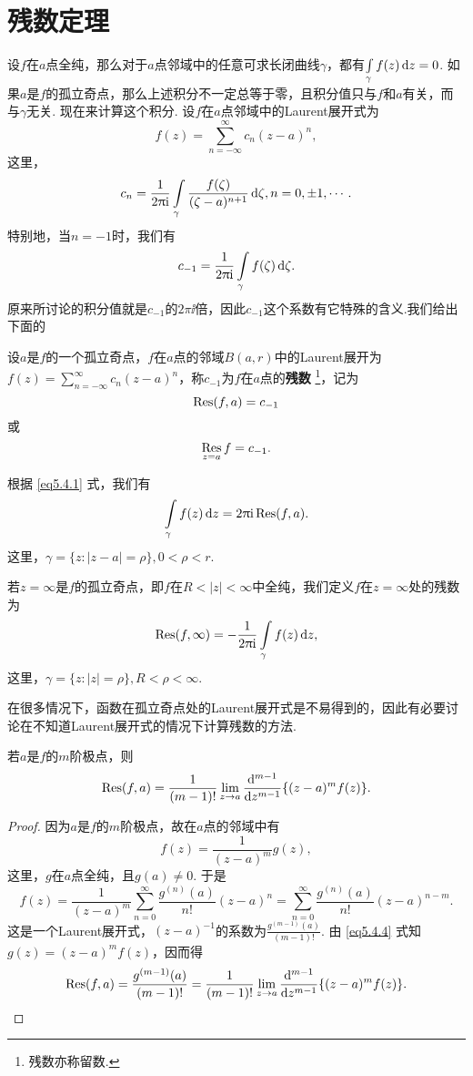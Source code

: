 \section{残数定理\label{sec5.4}}
设$f$在$a$点全纯，那么对于$a$点邻域中的任意可求长闭曲线$\gamma$，都有$\int\limits_\gamma f(z)\mathop{}\!\mathrm dz=0$. 如果$a$是$f$的孤立奇点，那么上述积分不一定总等于零，且积分值只与$f$和$a$有关，而与$\gamma$无关. 现在来计算这个积分. 设$f$在$a$点邻域中的Laurent展开式为
\[
  f(z) = \sum_{n=-\infty}^\infty c_n(z-a)^n,
\]
这里，
\[
  c_n = \frac1{2\uppi\mathrm i}\int\limits_{\gamma}\frac{f(\zeta)}{(\zeta-a)^{n+1}}\mathop{}\!\mathrm{d} \zeta,n=0,\pm1,\cdots.
\]
特别地，当$n=-1$时，我们有
\begin{equation}\label{eq5.4.1}
  c_{-1} = \frac1{2\uppi\mathrm i}\int\limits_{\gamma}f(\zeta)\mathop{}\!\mathrm{d} \zeta.
\end{equation}
原来所讨论的积分值就是$c_{-1}$的$2\pi\ii$倍，因此$c_{-1}$这个系数有它特殊的含义.我们给出下面的
\begin{definition}\label{def5.4.1}
  设$a$是$f$的一个孤立奇点，$f$在$a$点的邻域$B(a,r)$中的Laurent展开为$f(z)=\sum_{n=-\infty}^\infty c_n(z-a)^n$，称$c_{-1}$为$f$在$a$点的\textbf{残数}
  \footnote{残数亦称留数.}，记为
  \[
    \operatorname*{Res}(f,a) = c_{-1}
  \]
  或
  \[
    \operatorname*{Res}_{z=a}f = c_{-1}.
  \]
\end{definition}

根据 \eqref{eq5.4.1} 式，我们有
\begin{equation}\label{eq5.4.2}
  \int\limits_\gamma f(z)\mathop{}\!\mathrm dz = 2\uppi\mathrm i\operatorname*{Res}(f,a).
\end{equation}
这里，$\gamma=\{z:|z-a|=\rho\},0<\rho<r$.

若$z=\infty$是$f$的孤立奇点，即$f$在$R<|z|<\infty$中全纯，我们定义$f$在$z=\infty$处的残数为
\begin{equation}\label{eq5.4.3}
  \operatorname*{Res}(f,\infty) = -\frac1{2\uppi\mathrm i}\int\limits_\gamma f(z)\mathop{}\!\mathrm dz,
\end{equation}
这里，$\gamma=\{z:|z|=\rho\},R<\rho<\infty$.

在很多情况下，函数在孤立奇点处的Laurent展开式是不易得到的，因此有必要讨论在不知道Laurent展开式的情况下计算残数的方法.

\begin{prop}\label{prop5.4.2}
  若$a$是$f$的$m$阶极点，则
  \[
    \operatorname*{Res}(f,a) = \frac1{(m-1)!}\lim_{z\to a}\frac{\mathop{}\!\mathrm{d} ^{m-1}}{\mathop{}\!\mathrm{d} z^{m-1}}
    \{(z-a)^mf(z)\}.
  \]
\end{prop}
\begin{proof}
  因为$a$是$f$的$m$阶极点，故在$a$点的邻域中有
  \begin{equation}\label{eq5.4.4}
    f(z) = \frac1{(z-a)^m}g(z),
  \end{equation}
  这里，$g$在$a$点全纯，且$g(a)\ne0$. 于是
  \[
    f(z) = \frac1{(z-a)^m}\sum_{n=0}^\infty\frac{g^{(n)}(a)}{n!}(z-a)^n
    =\sum_{n=0}^\infty\frac{g^{(n)}(a)}{n!}(z-a)^{n-m}.
  \]
  这是一个Laurent展开式，$(z-a)^{-1}$的系数为$\frac{g^{(m-1)}(a)}{(m-1)!}$. 由 \eqref{eq5.4.4} 式知$g(z)=(z-a)^mf(z)$，因而得
  \begin{equation*}
    \operatorname*{Res}(f,a) = \frac{g^{(m-1)}(a)}{(m-1)!} = \frac1{(m-1)!}\lim_{z\to a}\frac{\mathop{}\!\mathrm{d} ^{m-1}}{\mathop{}\!\mathrm{d} z^{m-1}}\{(z-a)^mf(z)\}. \qedhere
  \end{equation*}
\end{proof}


